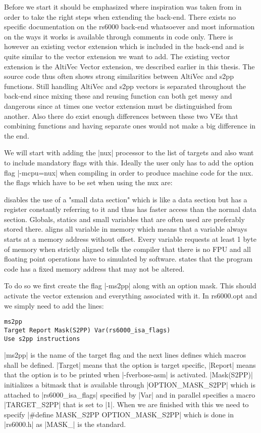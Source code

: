 Before we start it should be emphasized where inspiration was taken from in order to take the right steps when extending the back-end.
There exists no specific documentation on the rs6000 back-end whatsoever and most information on the ways it works is available through comments in code only.
There is however an existing vector extension which is included in the back-end and is quite similar to the vector extension we want to add.
The existing vector extension is the AltiVec Vector extension, we described earlier in this thesis.
The source code thus often shows strong similarities between AltiVec and s2pp functions.
Still handling AltiVec and s2pp vectors is separated throughout the back-end since mixing these and reusing function can both get messy and dangerous since at times one vector extension must be distinguished from another.
Also there do exist enough differences between these two VEs that combining functions and having separate ones would not make a big difference in the end.

We will start with adding the |nux| processor to the list of targets and also want to include mandatory flags with this.
Ideally the user only has to add the option flag |-mcpu=nux| when compiling in order to produce machine code for the nux.
the flags which have to be set when using the nux are:
\begin{description}
         disables the use of a "small data section" which is like a data section but has a register constantly referring to it and thus has faster access than the normal data section. Globals, statics and small variables that are often used are preferably stored there.
         aligns all variable in memory which means that a variable always starts at a memory address without offset. Every variable requests at least 1 byte of memory when strictly aligned
         tells the compiler that there is no FPU and all floating point operations have to simulated by software.
         states that the program code has a fixed memory address that may not be altered.
\end{description}

To do so we first create the flag |-ms2pp| along with an option mask.
This should activate the vector extension and everything associated with it.
In rs6000.opt and we simply need to add the lines:
\begin{lstlisting}
ms2pp
Target Report Mask(S2PP) Var(rs6000_isa_flags)
Use s2pp instructions
\end{lstlisting}
|ms2pp| is the name of the target flag and the next lines defines which macros shall be defined.
|Target| means that the option is target specific, |Report| means that the option is to be printed when |-fverbose-asm| is activated.
|Mask(S2PP)| initializes a bitmask that is available through |OPTION_MASK_S2PP| which is attached to |rs6000_isa_flags| specified by |Var| and in parallel specifies a macro |TARGET_S2PP| that is set to |1|. 
When we are finished with this we need to specify |#define MASK_S2PP OPTION_MASK_S2PP| which is done in |rs6000.h| as |MASK_| is the standard.

